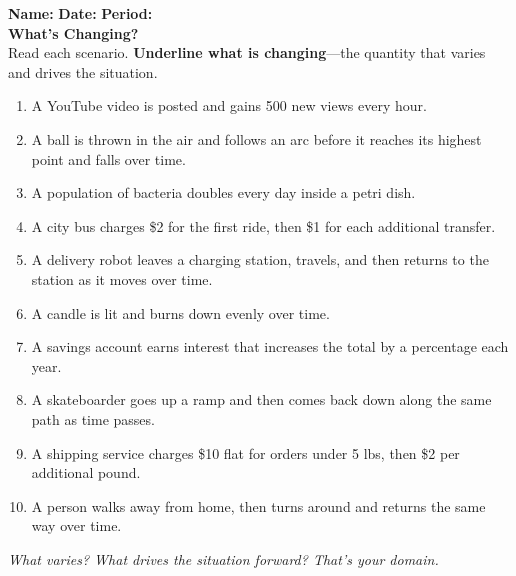 \documentclass[12pt,landscape]{article}
\begin{document}
\noindent
\begin{minipage}[t]{0.48\textwidth}
\raggedright
\vspace*{-1em}
\noindent
\textbf{Name:} \underline{\hspace{2in}} \hfill
\textbf{Date:} \underline{\hspace{0.5in}} \hfill
\textbf{Period:} \underline{\hspace{0.3in}} \\

\Large\textbf{What's Changing?} \\
\normalsize
\vspace{1em}
Read each scenario. \textbf{Underline what is changing}—the quantity that varies and drives the situation.

\vspace{1em}
\begin{enumerate}
  \item A YouTube video is posted and gains 500 new views every hour.
  \item A ball is thrown in the air and follows an arc before it reaches its highest point and falls over time.
  \item A population of bacteria doubles every day inside a petri dish.
  \item A city bus charges \$2 for the first ride, then \$1 for each additional transfer.
  \item A delivery robot leaves a charging station, travels, and then returns to the station as it moves over time.
  \item A candle is lit and burns down evenly over time.
  \item A savings account earns interest that increases the total by a percentage each year.
  \item A skateboarder goes up a ramp and then comes back down along the same path as time passes.
  \item A shipping service charges \$10 flat for orders under 5 lbs, then \$2 per additional pound.
  \item A person walks away from home, then turns around and returns the same way over time.
\end{enumerate}

\vfill
\small\textit{What varies? What drives the situation forward? That’s your domain.}
\end{minipage}%
\hfill
\end{document}
